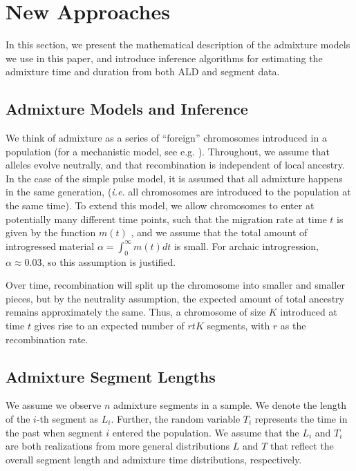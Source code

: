 \documentclass[11pt]{article}
\begin{document}
\section{New Approaches}\label{new approaches}

In this section, we present the mathematical description of the admixture models we use in this paper, and introduce inference algorithms for estimating the admixture time and duration from both ALD and segment data. 


\subsection{Admixture Models and Inference}\label{admixture models}
	
We think of admixture as a series of ``foreign'' chromosomes introduced in a population (for a mechanistic model, see e.g. \cite{pool_inference_2009}). Throughout, we assume that alleles evolve neutrally, and that recombination is independent of local ancestry. In the case of the simple pulse model, it is assumed that all admixture happens in the same generation, (\textit{i.e.} all chromosomes are introduced to the population at the same time). To extend this model, we allow chromosomes to enter at potentially many different time points, such that the migration rate at time $t$ is given by the function $m(t)$ \citep{pool_inference_2009}, and we assume that the total amount of introgressed material $\alpha=\int_0^\infty m(t)dt$ is small. For archaic introgression, $\alpha \approx 0.03$, so this assumption is justified.

Over time, recombination will split up the chromosome into smaller and smaller pieces, but by the neutrality assumption, the expected amount of total ancestry remains approximately the same. Thus, a chromosome of size $K$ introduced at time $t$ gives rise to an expected number of $rtK$ segments, with $r$ as the recombination rate.


\subsection{Admixture Segment Lengths}
We assume we observe $n$ admixture segments in a sample. We denote the length of the $i$-th segment as $L_i$. Further, the random variable $T_i$ represents the time in the past when segment $i$ entered the population. We assume that the $L_i$ and $T_i$ are both realizations from more general distributions $L$ and $T$ that reflect the overall segment length and admixture time distributions, respectively. 
\end{document}
